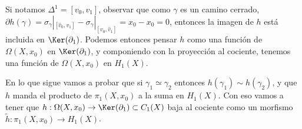 Si notamos $\Delta^1=[v_0,v_1]$, observar que como $\gamma$ es un camino cerrado, $\partial h(\gamma)=\sigma_\gamma|_{[\hat{v}_0,v_1]} - \sigma_\gamma|_{[v_0,\hat{v}_1]}=x_0 - x_0=0$, entonces la imagen de $h$ está incluida en $\Ker(\partial_1)$. Podemos entonces pensar $h$ como una función de $\Omega(X,x_0)$ en $\Ker(\partial_1)$, y componiendo con la proyección al cociente, tenemos una función de $\Omega(X,x_0)$ en $H_1(X)$.

En lo que sigue vamos a probar que si $\gamma_1\simeq \gamma_2$ entonces $h(\gamma_1)\sim h(\gamma_2)$, y que $h$ manda el producto de $\pi_1(X,x_0)$ a la suma en $H_1(X)$. Con eso vamos a tener que $h:\Omega(X,x_0)\to\Ker(\partial_1)\subset C_1(X)$ baja al cociente como un morfismo $\tilde{h}:\pi_1(X,x_0)\to H_1(X)$.



